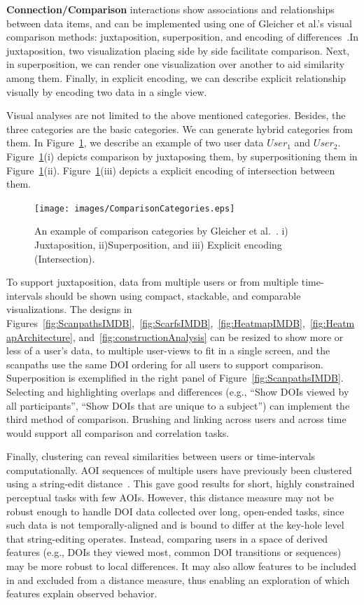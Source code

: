 \noindent \textbf{Connection/Comparison} interactions show associations and relationships between data items, and can be implemented using one of Gleicher et al.'s visual comparison methods: juxtaposition, superposition, and encoding of differences~\cite{Glei11}.In juxtaposition, two visualization placing side by side facilitate comparison. Next, in superposition, we can render one visualization over another to aid similarity among them. Finally, in explicit encoding, we can describe explicit relationship visually by encoding two data in a single view.

Visual analyses are not limited to the above mentioned categories. Besides, the three categories are the basic categories. We can generate hybrid categories from them. In Figure~\ref{fig:ComparisonCategories}, we describe an example of two user data $User_1$ and $User_2$. Figure~\ref{fig:ComparisonCategories}(i) depicts comparison by juxtaposing them, by superpositioning them in Figure~\ref{fig:ComparisonCategories}(ii). Figure~\ref{fig:ComparisonCategories}(iii) depicts a explicit encoding of intersection between them.  
\begin{figure}[htbp]
  \centering
  \texttt{[image: images/ComparisonCategories.eps]}
  \caption{An example of comparison categories by Gleicher et al.~\cite{Glei11}. i) Juxtaposition, ii)Superposition, and iii) Explicit encoding (Intersection).}
	\label{fig:ComparisonCategories}
\end{figure}

To support juxtaposition, data from multiple users or from multiple time-intervals should be shown using compact, stackable, and comparable visualizations. The designs in Figures~\ref{fig:ScanpathsIMDB},~\ref{fig:ScarfsIMDB},~\ref{fig:HeatmapIMDB},~\ref{fig:HeatmapArchitecture}, and~\ref{fig:constructionAnalysis} can be resized to show more or less of a user's data, to multiple user-views to fit in a single screen, and the scanpaths use the same DOI ordering for all users to support comparison. Superposition is exemplified in the right panel of Figure~\ref{fig:ScanpathsIMDB}. Selecting and highlighting overlaps and differences (e.g., ``Show DOIs viewed by all participants'', ``Show DOIs that are unique to a subject'') can implement the third method of comparison. Brushing and linking across users and across time would support all comparison and correlation tasks.

Finally, clustering can reveal similarities between users or time-intervals computationally. AOI sequences of multiple users have previously been clustered using a string-edit distance~\cite{Kur14}. This gave good results for short, highly constrained perceptual tasks with few AOIs. However, this distance measure may not be robust enough to handle DOI data collected over long, open-ended tasks, since such data is not temporally-aligned and is bound to differ at the key-hole level that string-editing operates. Instead, comparing users in a space of derived features (e.g., DOIs they viewed most, common DOI transitions or sequences) may be more robust to local differences. It may also allow features to be included in and excluded from a distance measure, thus enabling an exploration of which features explain observed behavior.



